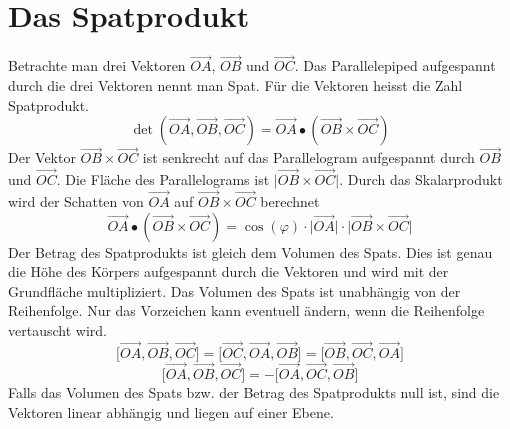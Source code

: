 \section{Das Spatprodukt}
Betrachte man drei Vektoren $\overrightarrow{OA}$, $\overrightarrow{OB}$ und $\overrightarrow{OC}$. Das Parallelepiped aufgespannt durch die drei Vektoren nennt man Spat. Für die Vektoren heisst die Zahl Spatprodukt.
\begin{equation}
\boxed{\det\left(\overrightarrow{OA}, \overrightarrow{OB}, \overrightarrow{OC}\right)=\overrightarrow{OA}\bullet \left(\overrightarrow{OB}\times \overrightarrow{OC}\right)}
\end{equation}
Der Vektor $\overrightarrow{OB}\times \overrightarrow{OC}$ ist senkrecht auf das Parallelogram aufgespannt durch $\overrightarrow{OB}$ und $\overrightarrow{OC}$. Die Fläche des Parallelograms ist $\Big\vert\overrightarrow{OB}\times \overrightarrow{OC}\Big\vert$.
\newline\newline
Durch das Skalarprodukt wird der Schatten von $\overrightarrow{OA}$ auf $\overrightarrow{OB}\times \overrightarrow{OC}$ berechnet
\begin{equation}
\boxed{\overrightarrow{OA}\bullet \left(\overrightarrow{OB}\times \overrightarrow{OC}\right)=\cos\left(\varphi\right)\cdot \Big\vert\overrightarrow{OA}\Big\vert\cdot \Big\vert\overrightarrow{OB}\times \overrightarrow{OC}\Big\vert}
\end{equation}
Der Betrag des Spatprodukts ist gleich dem Volumen des Spats. Dies ist genau die Höhe des Körpers aufgespannt durch die Vektoren und wird mit der Grundfläche multipliziert.
\newline \newline
Das Volumen des Spats ist unabhängig von der Reihenfolge. Nur das Vorzeichen kann eventuell ändern, wenn die Reihenfolge vertauscht wird.
\begin{equation}
\boxed{\Big[\overrightarrow{OA}, \overrightarrow{OB}, \overrightarrow{OC}\Big]=\Big[\overrightarrow{OC}, \overrightarrow{OA}, \overrightarrow{OB}\Big]=\Big[\overrightarrow{OB}, \overrightarrow{OC}, \overrightarrow{OA}\Big]}
\end{equation}
\begin{equation}
\boxed{\Big[\overrightarrow{OA}, \overrightarrow{OB}, \overrightarrow{OC}\Big]=-\Big[\overrightarrow{OA}, \overrightarrow{OC}, \overrightarrow{OB}\Big]}
\end{equation}
Falls das Volumen des Spats bzw. der Betrag des Spatprodukts null ist, sind die Vektoren linear abhängig und liegen auf einer Ebene.
